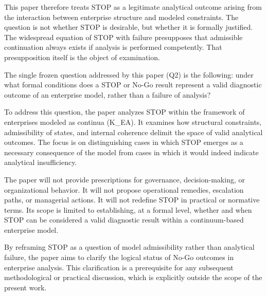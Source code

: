 This paper therefore treats STOP as a legitimate analytical outcome arising from the interaction between enterprise structure and modeled constraints. The question is not whether STOP is desirable, but whether it is formally justified. The widespread equation of STOP with failure presupposes that admissible continuation always exists if analysis is performed competently. That presupposition itself is the object of examination.

The single frozen question addressed by this paper (Q2) is the following: under what formal conditions does a STOP or No-Go result represent a valid diagnostic outcome of an enterprise model, rather than a failure of analysis?

To address this question, the paper analyzes STOP within the framework of enterprises modeled as continua (K\_EA). It examines how structural constraints, admissibility of states, and internal coherence delimit the space of valid analytical outcomes. The focus is on distinguishing cases in which STOP emerges as a necessary consequence of the model from cases in which it would indeed indicate analytical insufficiency.

The paper will not provide prescriptions for governance, decision-making, or organizational behavior. It will not propose operational remedies, escalation paths, or managerial actions. It will not redefine STOP in practical or normative terms. Its scope is limited to establishing, at a formal level, whether and when STOP can be considered a valid diagnostic result within a continuum-based enterprise model.

By reframing STOP as a question of model admissibility rather than analytical failure, the paper aims to clarify the logical status of No-Go outcomes in enterprise analysis. This clarification is a prerequisite for any subsequent methodological or practical discussion, which is explicitly outside the scope of the present work.
